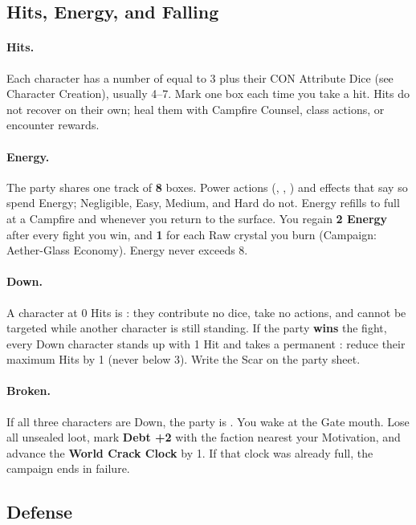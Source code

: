 \subsection{Hits, Energy, and Falling}

\paragraph{Hits.}
Each character has a number of  equal to 3 plus their CON Attribute Dice (see Character Creation), usually 4--7. Mark one box each time you take a hit. Hits do not recover on their own; heal them with Campfire Counsel, class actions, or encounter rewards.

\paragraph{Energy.}
The party shares one  track of \textbf{8} boxes. Power actions (\grand, \dire, \fell) and effects that say so spend Energy; Negligible, Easy, Medium, and Hard do not. Energy refills to full at a Campfire and whenever you return to the surface. You regain \textbf{2 Energy} after every fight you win, and \textbf{1} for each Raw crystal you burn (Campaign: Aether-Glass Economy). Energy never exceeds 8.

\paragraph{Down.}
A character at 0 Hits is : they contribute no dice, take no actions, and cannot be targeted while another character is still standing. If the party \textbf{wins} the fight, every Down character stands up with 1 Hit and takes a permanent : reduce their maximum Hits by 1 (never below 3). Write the Scar on the party sheet.

\paragraph{Broken.}
If all three characters are Down, the party is . You wake at the Gate mouth. Lose all unsealed loot, mark \textbf{Debt +2} with the faction nearest your Motivation, and advance the \textbf{World Crack Clock} by 1. If that clock was already full, the campaign ends in failure.

\subsection{Defense}

